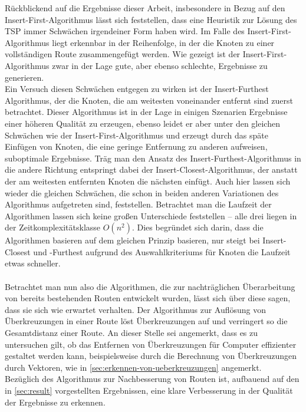 Rückblickend auf die Ergebnisse dieser Arbeit, insbesondere in Bezug auf den Insert-First-Algorithmus lässt sich feststellen, dass eine Heuristik zur Lösung des \ac{TSP} immer Schwächen irgendeiner Form haben wird.
Im Falle des Insert-First-Algorithmus liegt erkennbar in der Reihenfolge, in der die Knoten zu einer vollständigen Route zusammengefügt werden.
Wie gezeigt ist der Insert-First-Algorithmus zwar in der Lage gute, aber ebenso schlechte, Ergebnisse zu generieren.
\\
Ein Versuch diesen Schwächen entgegen zu wirken ist der Insert-Furthest Algorithmus, der die Knoten, die am weitesten voneinander entfernt sind zuerst betrachtet.
Dieser Algorithmus ist in der Lage in einigen Szenarien Ergebnisse einer höheren Qualität zu erzeugen, ebenso leidet er aber unter den gleichen Schwächen wie der Insert-First-Algorithmus und erzeugt durch das späte Einfügen von Knoten, die eine geringe Entfernung zu anderen aufweisen, suboptimale Ergebnisse.
Träg man den Ansatz des Insert-Furthest-Algorithmus in die andere Richtung entspringt dabei der Insert-Closest-Algorithmus, der anstatt der am weitesten entfernten Knoten die nächsten einfügt.
Auch hier lassen sich wieder die gleichen Schwächen, die schon in beiden anderen Variationen des Algorithmus aufgetreten sind, feststellen.
Betrachtet man die Laufzeit der Algorithmen lassen sich keine großen Unterschiede feststellen -- alle drei liegen in der Zeitkomplexitätsklasse $O(n^2)$.
Dies begründet sich darin, dass die Algorithmen basieren auf dem gleichen Prinzip basieren, nur steigt bei Insert-Closest und -Furthest aufgrund des Auswahlkriteriums für Knoten die Laufzeit etwas schneller.
\\\\
Betrachtet man nun also die Algorithmen, die zur nachträglichen Überarbeitung von bereits bestehenden Routen entwickelt wurden, lässt sich über diese sagen, dass sie sich wie erwartet verhalten.
Der Algorithmus zur Auflösung von Überkreuzungen in einer Route löst Überkreuzungen auf und verringert so die Gesamtdistanz einer Route. 
An dieser Stelle sei angemerkt, dass es zu untersuchen gilt, ob das Entfernen von Überkreuzungen für Computer effizienter gestaltet werden kann, beispielsweise durch die Berechnung von Überkreuzungen durch Vektoren, wie in \vref{sec:erkennen-von-ueberkreuzungen} angemerkt.
\\
Bezüglich des Algorithmus zur Nachbesserung von Routen ist, aufbauend auf den in \vref{sec:result} vorgestellten Ergebnissen, eine klare Verbesserung in der Qualität der Ergebnisse zu erkennen.
